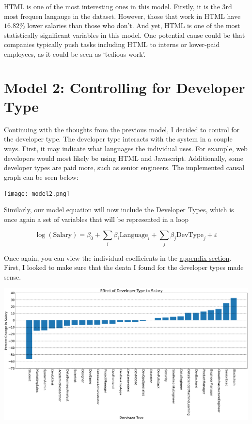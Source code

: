 \documentclass{report}
\begin{document}
HTML is one of the most interesting ones in this model. Firstly, it is the 3rd most frequen langauge in the dataset. However, those that work in HTML have $16.82\%$ lower salaries than those who don't. And yet, HTML is one of the most statistically significant variables in this model. One potential cause could be that companies typically push tasks including HTML to interns or lower-paid employees, as it could be seen as `tedious work'.

\newpage

\section{Model 2: Controlling for Developer Type}

Continuing with the thoughts from the previous model, I decided to control for the developer type. The developer type interacts with the system in a couple ways. First, it may indicate what languages the individual uses. For example, web developers would most likely be using HTML and Javascript. Additionally, some developer types are paid more, such as senior engineers. The implemented causal graph can be seen below:

\texttt{[image: model2.png]}

Similarly, our model equation will now include the Developer Types, which is once again a set of variables that will be represented in a loop

$$\log({\text{Salary}}) = \beta_0 + \sum_i{\beta_i \text{Language}_i} + \sum_j{\beta_j \text{DevType}_j} + \varepsilon$$

Once again, you can view the individual coefficients in the \hyperref[data:model2]{appendix section}. First, I looked to make sure that the deata I found for the developer types made sense.

\vspace{0.5in}

\includegraphics[width=0.9\linewidth]{model2coefficientdevtype.png}
\end{document}
